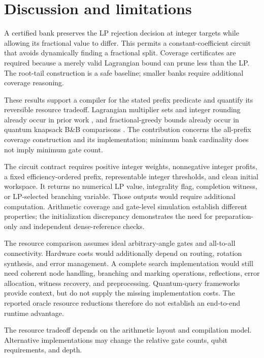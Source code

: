 \documentclass[referee,pdflatex,sn-mathphys-num]{sn-jnl}
\theoremstyle{thmstyleone}
\theoremstyle{thmstyletwo}
\begin{document}
\section{Discussion and limitations}\label{sec:discussion}
A certified bank preserves the LP rejection decision at integer targets while allowing its fractional value to differ. This permits a constant-coefficient circuit that avoids dynamically finding a fractional split. Coverage certificates are required because a merely valid Lagrangian bound can prune less than the LP. The root-tail construction is a safe baseline; smaller banks require additional coverage reasoning.

These results support a compiler for the stated prefix predicate and quantify its reversible resource tradeoff. Lagrangian multiplier sets and integer rounding already occur in prior work \cite{bozejko2026}, and fractional-greedy bounds already occur in quantum knapsack B\&B comparisons \cite{wilkening2025}. The contribution concerns the all-prefix coverage construction and its implementation; minimum bank cardinality does not imply minimum gate count.

The circuit contract requires positive integer weights, nonnegative integer profits, a fixed efficiency-ordered prefix, representable integer thresholds, and clean initial workspace. It returns no numerical LP value, integrality flag, completion witness, or LP-selected branching variable. Those outputs would require additional computation. Arithmetic coverage and gate-level simulation establish different properties; the initialization discrepancy demonstrates the need for preparation-only and independent dense-reference checks.

The resource comparison assumes ideal arbitrary-angle gates and all-to-all connectivity. Hardware costs would additionally depend on routing, rotation synthesis, and error management. A complete search implementation would still need coherent node handling, branching and marking operations, reflections, error allocation, witness recovery, and preprocessing. Quantum-query frameworks \cite{ref35,ref24} provide context, but do not supply the missing implementation costs. The reported oracle resource reductions therefore do not establish an end-to-end runtime advantage.

The resource tradeoff depends on the arithmetic layout and compilation model. Alternative implementations may change the relative gate counts, qubit requirements, and depth.
\end{document}
